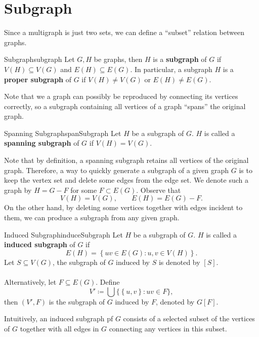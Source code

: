 \documentclass[math]{amznotes}
\theoremstyle{remark}
\begin{document}
\section{Subgraph}
Since a multigraph is just two sets, we can define a ``subset'' relation between graphs.
\begin{dfnbox}{Subgraph}{subgraph}
    Let $G, H$ be graphs, then $H$ is a {\color{red} \textbf{subgraph}} of $G$ if $V(H) \subseteq V(G)$ and $E(H) \subseteq E(G)$. In particular, a subgraph $H$ is a {\color{red} \textbf{proper subgraph}} of $G$ if $V(H) \neq V(G)$ or $E(H) \neq E(G)$.
\end{dfnbox}
Note that we a graph can possibly be reproduced by connecting its vertices correctly, so a subgraph containing all vertices of a graph ``spans'' the original graph.
\begin{dfnbox}{Spanning Subgraph}{spanSubgraph}
    Let $H$ be a subgraph of $G$. $H$ is called a {\color{red} \textbf{spanning subgraph}} of $G$ if $V(H) = V(G)$.
\end{dfnbox}
Note that by definition, a spanning subgraph retains all vertices of the original graph. Therefore, a way to quickly generate a subgraph of a given graph $G$ is to keep the vertex set and delete some edges from the edge set. We denote such a graph by $H = G - F$ for some $F \subset E(G)$. Observe that 
\begin{equation*}
    V(H) = V(G), \qquad E(H) = E(G) - F.
\end{equation*}
On the other hand, by deleting some vertices together with edges incident to them, we can produce a subgraph from any given graph.
\begin{dfnbox}{Induced Subgraph}{induceSubgraph}
    Let $H$ be a subgraph of $G$. $H$ is called a {\color{red} \textbf{induced subgraph}} of $G$ if
    \begin{equation*}
        E(H) = \left\{uv \in E(G) \colon u, v \in V(H)\right\}.
    \end{equation*}
    Let $S \subseteq V(G)$, the subgraph of $G$ induced by $S$ is denoted by $[S]$.
    \\\\
    Alternatively, let $F \subseteq E(G)$. Define
    \begin{equation*}
        V' \coloneqq \bigcup \bigl\{\left\{u, v\right\} \colon uv \in F\bigr\},
    \end{equation*}
    then $(V', F)$ is the subgraph of $G$ induced by $F$, denoted by $G[F]$.
\end{dfnbox}
Intuitively, an induced subgraph pf $G$ consists of a selected subset of the vertices of $G$ together with all edges in $G$ connecting any vertices in this subset.
\end{document}
